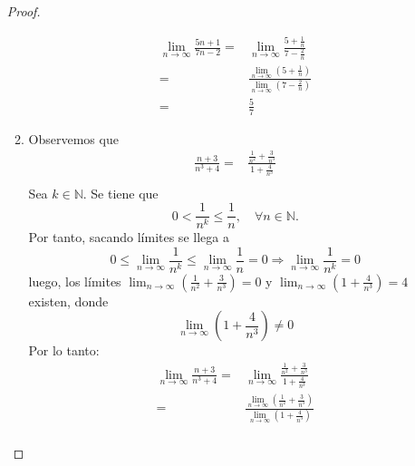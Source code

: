 \documentclass[12pt]{article}
\begin{document}
\begin{enumerate}
\begin{proof}
\begin{enumerate}
\begin{equation*}
\begin{split}
                        \lim_{n\rightarrow\infty}\frac{5n+1}{7n-2}=&\lim_{n\rightarrow\infty}\frac{5+\frac{1}{n}}{7-\frac{2}{n}}\\
                        =&\frac{\lim_{n\rightarrow\infty}\left(5+\frac{1}{n}\right)}{\lim_{n\rightarrow\infty}\left(7-\frac{2}{n}\right)}\\
                        =&\frac{5}{7}
                    \end{split}
                \end{equation*}
                \item Observemos que
                \begin{equation*}
                    \begin{split}
                        \frac{n+3}{n^3+4}=&\frac{\frac{1}{n^2}+\frac{3}{n^3}}{1+\frac{4}{n^3}}\\
                    \end{split}
                \end{equation*}
                Sea $k\in\mathbb{N}$. Se tiene que
                \begin{equation*}
                    0<\frac{1}{n^k}\leq\frac{1}{n},\quad \forall n\in\mathbb{N}.
                \end{equation*}
                Por tanto, sacando límites se llega a
                \begin{equation*}
                    0\leq \lim_{n\rightarrow\infty}\frac{1}{n^k}\leq\lim_{n\rightarrow\infty}\frac{1}{n}=0\Rightarrow \lim_{n\rightarrow\infty}\frac{1}{n^k}=0
                \end{equation*}
                luego, los límites $\lim_{n\rightarrow\infty}\left(\frac{1}{n^2}+\frac{3}{n^3}\right)=0$ y $\lim_{n\rightarrow\infty}\left(1+\frac{4}{n^3}\right)=4$ existen, donde 
                \begin{equation*}
                    \lim_{n\rightarrow\infty}\left(1+\frac{4}{n^3}\right)\neq0
                \end{equation*}
                Por lo tanto:
                \begin{equation*}
                    \begin{split}
                        \lim_{n\rightarrow\infty}\frac{n+3}{n^3+4}=&\lim_{n\rightarrow\infty}\frac{\frac{1}{n^2}+\frac{3}{n^3}}{1+\frac{4}{n^3}}\\
                        =&\frac{\lim_{n\rightarrow\infty}\left(\frac{1}{n^2}+\frac{3}{n^3}\right)}{\lim_{n\rightarrow\infty}\left(1+\frac{4}{n^3}\right)}\\

\end{split}
\end{equation*}
\end{enumerate}
\end{proof}
\end{enumerate}
\end{document}
